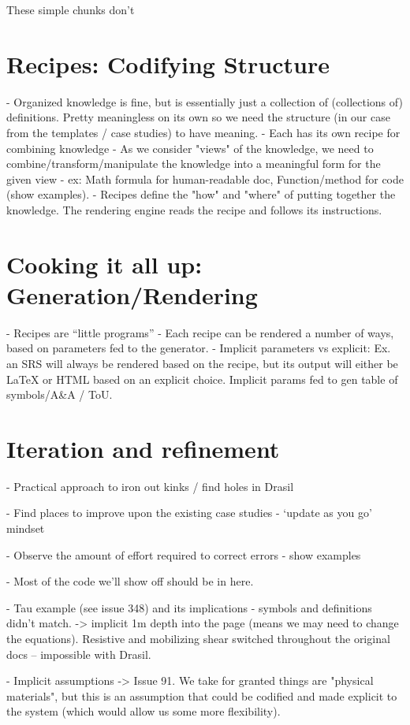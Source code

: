 
These simple chunks don't 

\section{Recipes: Codifying Structure}
  - Organized knowledge is fine, but is essentially just a collection of (collections of) definitions. Pretty meaningless on its own so we need the structure (in our case from the templates / case studies) to have meaning.
  - Each \sf{} has its own recipe for combining knowledge
  - As we consider \sfs{} "views" of the knowledge, we need to 
  combine/transform/manipulate the knowledge into a meaningful form for the 
  given view - ex: Math formula for human-readable doc, Function/method for 
  code (show examples).
  - Recipes define the "how" and "where" of putting together the knowledge. The rendering engine reads the recipe and follows its instructions.

\section{Cooking it all up: Generation/Rendering}
  - Recipes are “little programs”
  - Each recipe can be rendered a number of ways, based on parameters fed to the generator.
  -  Implicit parameters vs explicit: Ex. an SRS will always be rendered based on the recipe, but its output will either be LaTeX or HTML based on an explicit choice. Implicit params fed to gen table of symbols/A\&A / ToU.


\section{Iteration and refinement}

  - Practical approach to iron out kinks / find holes in Drasil

  - Find places to improve upon the existing case studies - ‘update as you go’ 
  mindset

  - Observe the amount of effort required to correct errors - show examples

  - Most of the code we’ll show off should be in here.

  - Tau example (see issue 348) and its implications - symbols and definitions 
  didn't match. -> implicit 1m depth into the page (means we may need to change 
  the equations). Resistive and mobilizing shear switched throughout the 
  original docs -- impossible with Drasil.

  -  Implicit assumptions -> 
  Issue 91. We take for granted things are "physical 
  materials", but this is an assumption that could be codified and made 
  explicit to the system (which would allow us some more flexibility).